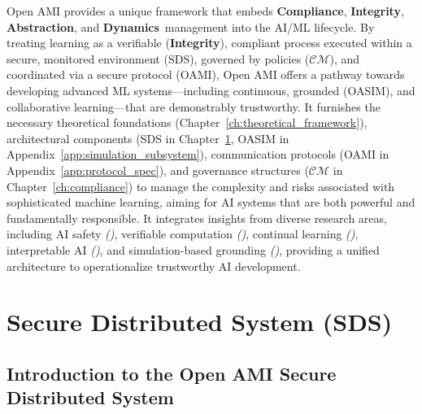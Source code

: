 \documentclass[12pt,a4paper]{report}
\renewcommand{\citep}[1]{\textit{\scriptsize{(\cite{#1})}}}
\newcommand{\Compliance}{\textbf{Compliance}}
\newcommand{\Integrity}{\textbf{Integrity}}
\newcommand{\Abstraction}{\textbf{Abstraction}}
\newcommand{\Dynamics}{\textbf{Dynamics}}
\begin{document}
	Open AMI provides a unique framework that embeds \Compliance, \Integrity, \Abstraction, and \Dynamics\ management into the AI/ML lifecycle. By treating learning as a verifiable (\Integrity), compliant process executed within a secure, monitored environment (SDS), governed by policies ($\mathcal{CM}$), and coordinated via a secure protocol (OAMI), Open AMI offers a pathway towards developing advanced ML systems—including continuous, grounded (OASIM), and collaborative learning—that are demonstrably trustworthy. It furnishes the necessary theoretical foundations (Chapter~\ref{ch:theoretical_framework}), architectural components (SDS in Chapter~\ref{ch:secure_distributed_system}, OASIM in Appendix~\ref{app:simulation_subsystem}), communication protocols (OAMI in Appendix~\ref{app:protocol_spec}), and governance structures ($\mathcal{CM}$ in Chapter~\ref{ch:compliance}) to manage the complexity and risks associated with sophisticated machine learning, aiming for AI systems that are both powerful and fundamentally responsible. It integrates insights from diverse research areas, including AI safety \citep{Kovac2025SpecGaming}, verifiable computation \citep{Peng2025ZKMLSurvey, Jia2021ProofOfLearning}, continual learning \citep{Wang2024ContinualLearningSurvey}, interpretable AI \citep{Anthropic_Decompose_2023, Xu2025InterpretabilitySurvey}, and simulation-based grounding \citep{Li2025DigitalTwins, Berg2025DigitalTwin}, providing a unified architecture to operationalize trustworthy AI development.
	
		\chapter{Secure Distributed System (SDS)} %
	\label{ch:secure_distributed_system}
	
	\section{Introduction to the Open AMI Secure Distributed System} %
	\label{sec:4-1} %
	
\end{document}
